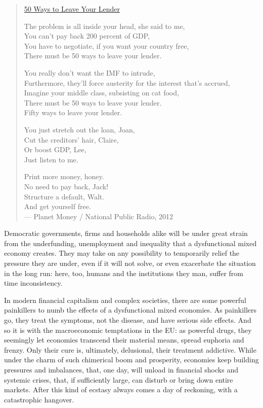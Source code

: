 \documentclass[11pt,a4paper,oneside,openright]{article}
\begin{document}
\begin{verse} 
	\href{http://www.npr.org/blogs/money/2012/03/01/147720368/50-ways-to-leave-your-lender}{50 Ways to Leave Your Lender}
	
	The problem is all inside your head, she said to me,\\
	You can't pay back 200 percent of GDP,\\
	You have to negotiate, if you want your country free,\\
	There must be 50 ways to leave your lender.

	You really don't want the IMF to intrude,\\
	Furthermore, they'll force austerity for the interest that's accrued,\\
	Imagine your middle class, subsisting on cat food,\\
	There must be 50 ways to leave your lender.\\
	Fifty ways to leave your lender.

	You just stretch out the loan, Joan,\\
	Cut the creditors' hair, Claire,\\
	Or boost GDP, Lee,\\
	Just listen to me.

	Print more money, honey.\\
	No need to pay back, Jack!\\
	Structure a default, Walt.\\
	And get yourself free.\\
	--- Planet Money / National Public Radio, 2012
\end{verse}

Democratic governments, firms and households alike will be under great strain from the underfunding, unemployment and inequality that a dysfunctional mixed economy creates. %
They may take on any possibility to temporarily relief the pressure they are under, even if it will not solve, or even exacerbate the situation in the long run: 
here, too, humans and the institutions they man, suffer from time inconsistency.

In modern financial capitalism and complex societies, there are some powerful painkillers to numb the effects of a dysfunctional mixed economies. 
As painkillers go, they treat the symptoms, not the disease, and have serious side effects. 
And so it is with the macroeconomic temptations in the \gls{EU}: 
as powerful drugs, they seemingly let economies transcend their material means, spread euphoria and frenzy. 
Only their cure is, ultimately, delusional, their treatment addictive. 
While under the charm of such chimerical boom and prosperity, economies keep building pressures and imbalances, that, one day, will unload in financial shocks and systemic crises, that, if sufficiently large, can disturb or bring down entire markets. 
After this kind of ecstasy always comes a day of reckoning, with a catastrophic hangover.
\end{document}
